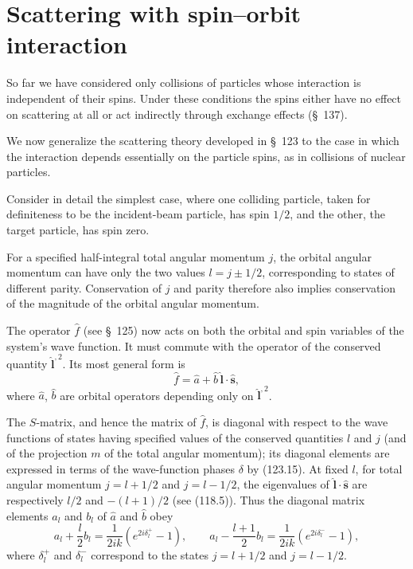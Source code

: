 \section{Scattering with spin--orbit interaction}

So far we have considered only collisions of particles whose interaction is
independent of their spins. Under these conditions the spins either have no
effect on scattering at all or act indirectly through exchange effects
(\S~137).

We now generalize the scattering theory developed in \S~123 to the case in
which the interaction depends essentially on the particle spins, as in
collisions of nuclear particles.

Consider in detail the simplest case, where one colliding particle, taken for
definiteness to be the incident-beam particle, has spin $1/2$, and the other,
the target particle, has spin zero.

For a specified half-integral total angular momentum $j$, the orbital angular
momentum can have only the two values $l=j\pm1/2$, corresponding to states of
different parity. Conservation of $j$ and parity therefore also implies
conservation of the magnitude of the orbital angular momentum.

The operator $\hat f$ (see \S~125) now acts on both the orbital and spin
variables of the system's wave function. It must commute with the operator of
the conserved quantity $\hat{\mathbf l}^{,2}$. Its most general form is
\begin{equation}
 \hat f=\hat a+\hat b\,\hat{\mathbf l}\cdot\hat{\mathbf s},
 \tag{140.1}
\end{equation}
where $\hat a$, $\hat b$ are orbital operators depending only on
$\hat{\mathbf l}^{,2}$.

The $S$-matrix, and hence the matrix of $\hat f$, is diagonal with respect to
the wave functions of states having specified values of the conserved
quantities $l$ and $j$ (and of the projection $m$ of the total angular
momentum); its diagonal elements are expressed in terms of the wave-function
phases $\delta$ by (123.15). At fixed $l$, for total angular momentum
$j=l+1/2$ and $j=l-1/2$, the eigenvalues of
$\hat{\mathbf l}\cdot\hat{\mathbf s}$ are respectively $l/2$ and
$-(l+1)/2$ (see (118.5)). Thus the diagonal matrix elements $a_l$ and $b_l$
of $\hat a$ and $\hat b$ obey
\begin{equation}
 a_l+\frac l2b_l=\frac1{2ik}(e^{2i\delta_l^+}-1),\qquad
 a_l-\frac{l+1}{2}b_l=\frac1{2ik}(e^{2i\delta_l^-}-1),
 \tag{140.2}
\end{equation}
where $\delta_l^+$ and $\delta_l^-$ correspond to the states $j=l+1/2$ and
$j=l-1/2$.

